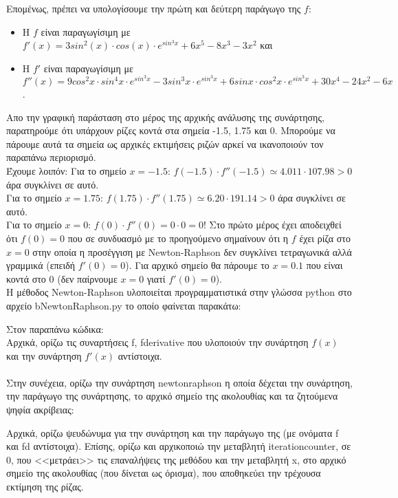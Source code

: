 \documentclass[a4paper,11pt]{article}
\newcommand{\lt}{\latintext}
\newcommand{\gt}{\greektext}
\begin{document}
Επομένως, πρέπει να υπολογίσουμε την πρώτη και δεύτερη παράγωγο της $f$:

\par
\vspace{20pt}
\begin{itemize}
    \item Η $f$ είναι παραγωγίσιμη με $f'(x) = 3sin^2(x) \cdot cos(x) \cdot e^{sin^3x} + 6x^5 - 8x^3 - 3x^2$ και 
    \item Η $f'$ είναι παραγωγίσιμη με $f''(x) = 9cos^2x \cdot sin^4x \cdot e^{sin^3x} - 3sin^3x \cdot e^{sin^3x} + 6sinx \cdot cos^2x \cdot e^{sin^3x} + 30x^4 - 24x^2 - 6x$.
\end{itemize}

Απο την γραφική παράσταση στο μέρος της αρχικής ανάλυσης της συνάρτησης, παρατηρούμε ότι υπάρχουν ρίζες κοντά στα σημεία -1.5, 1.75 και 0. Μπορούμε να πάρουμε αυτά τα σημεία ως αρχικές εκτιμήσεις ριζών αρκεί να ικανοποιούν τον παραπάνω περιορισμό.\\
Έχουμε λοιπόν:
Για το σημείο $x = -1.5$: $f(-1.5) \cdot f''(-1.5) \simeq 4.011 \cdot 107.98 > 0$ άρα συγκλίνει σε αυτό.\\
Για το σημείο $x = 1.75$: $f(1.75) \cdot f''(1.75) \simeq 6.20 \cdot 191.14 > 0$ άρα συγκλίνει σε αυτό.\\
Για το σημείο $x = 0$: $f(0) \cdot f''(0) = 0 \cdot 0 = 0$! Στο πρώτο μέρος έχει αποδειχθεί ότι $f(0) = 0 $ που σε συνδυασμό με το προηγούμενο σημαίνουν ότι η $f$ έχει ρίζα στο $x = 0$ στην οποία η προσέγγιση με {\lt Newton-Raphson} δεν συγκλίνει τετραγωνικά αλλά γραμμικά (επειδή  $f'(0) = 0$). Για αρχικό σημείο θα πάρουμε το $x = 0.1$ που είναι κοντά στο 0 (δεν παίρνουμε $x = 0$ γιατί $f'(0) = 0$).\\

Η μέθοδος {\lt Newton-Raphson} υλοποιείται προγραμματιστικά στην γλώσσα {\lt python} στο αρχείο {\lt b\textunderscore Newton\textunderscore Raphson.py} το οποίο φαίνεται παρακάτω:

\lt

\gt

Στον παραπάνω κώδικα:
\\
Αρχικά, ορίζω τις συναρτήσεις {\lt f, f\textunderscore derivative} που υλοποιούν την συνάρτηση $f(x)$ και την συνάρτηση $f'(x)$ αντίστοιχα.\\
\\
Στην συνέχεια, ορίζω την συνάρτηση {\lt newton\textunderscore raphson} η οποία δέχεται την συνάρτηση, την παράγωγο της συνάρτησης, το αρχικό σημείο της ακολουθίας και τα ζητούμενα ψηφία ακρίβειας:\par
Αρχικά, ορίζω ψευδώνυμα για την συνάρτηση και την παράγωγο της (με ονόματα {\lt f} και {\lt f\textunderscore d} αντίστοιχα).
Επίσης, ορίζω και αρχικοποιώ την μεταβλητή {\lt iteration\textunderscore counter}, σε 0,  που <<μετράει>> τις επαναλήψεις της μεθόδου και την μεταβλητή {\lt x}, στο αρχικό σημείο της ακολουθίας (που δίνεται ως όρισμα), που αποθηκεύει την τρέχουσα εκτίμηση της ρίζας.
\end{document}
